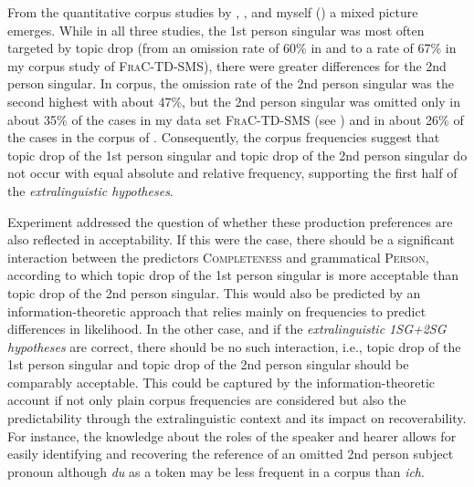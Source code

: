 From the quantitative corpus  studies by \citet{androutsopoulos.schmidt2002}, \citet{frick2017}, and myself () a mixed picture emerges.
While in all three studies, the 1st person singular was most often targeted by topic drop (from an omission rate of 60\% in \citet{androutsopoulos.schmidt2002} and \citet{frick2017} to a rate of 67\% in my corpus study of \textsc{FraC-TD-SMS}), there were greater differences for the 2nd person singular.
In  corpus,  the omission rate of the 2nd person singular was the second highest with about 47\%, but the 2nd person singular was omitted only in about 35\% of the cases in my data set \textsc{FraC-TD-SMS} (see ) and in about 26\% of the cases in the corpus of \citet{androutsopoulos.schmidt2002}.
Consequently, the corpus  frequencies suggest that topic drop of the 1st person singular and topic drop of the 2nd person singular do not occur with equal absolute and relative frequency, supporting the first half of the \textit{extralinguistic hypotheses}.

Experiment  addressed the question of whether these production preferences are also reflected in acceptability.
If this were the case, there should be a significant interaction between the predictors \textsc{Completeness} and grammatical \textsc{Person}, according to which topic drop of the 1st person singular is more acceptable than topic drop of the 2nd person singular.
This would also be predicted by an information-theoretic approach that relies mainly on frequencies to predict differences in likelihood.
In the other case, and if the \textit{extralinguistic 1SG+2SG hypotheses} are correct, there should be no such interaction, i.e., topic drop of the 1st person singular and topic drop of the 2nd person singular should be comparably acceptable.
This could be captured by the information-theoretic account if not only plain corpus  frequencies are considered but also the predictability through the extralinguistic context and its impact on recoverability. 
For instance, the knowledge about the roles of the speaker and hearer allows for easily identifying and recovering the reference of an omitted 2nd person subject pronoun although \textit{du} as a token may be less frequent in a corpus than \textit{ich}.

